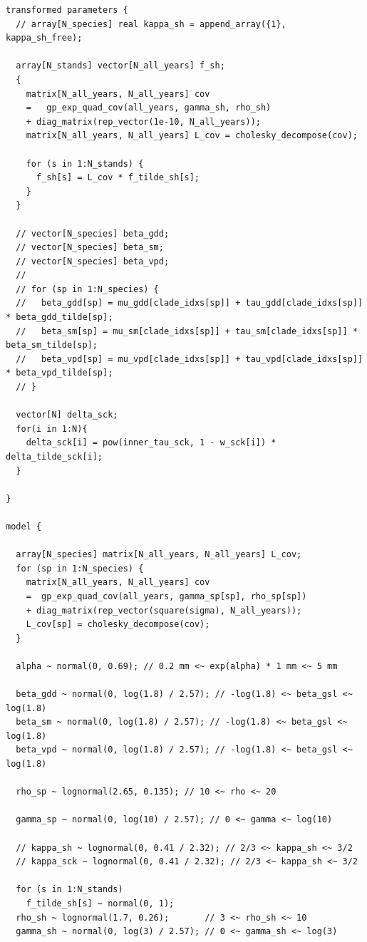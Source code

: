 \documentclass[
  letterpaper,
  DIV=11,
  numbers=noendperiod]{scrartcl}
\begin{document}
\begin{verbatim}
transformed parameters {
  // array[N_species] real kappa_sh = append_array({1}, kappa_sh_free);
  
  array[N_stands] vector[N_all_years] f_sh;
  {
    matrix[N_all_years, N_all_years] cov
    =   gp_exp_quad_cov(all_years, gamma_sh, rho_sh)
    + diag_matrix(rep_vector(1e-10, N_all_years));
    matrix[N_all_years, N_all_years] L_cov = cholesky_decompose(cov);
    
    for (s in 1:N_stands) {
      f_sh[s] = L_cov * f_tilde_sh[s];
    }
  }
  
  // vector[N_species] beta_gdd;
  // vector[N_species] beta_sm;
  // vector[N_species] beta_vpd;
  // 
  // for (sp in 1:N_species) {
  //   beta_gdd[sp] = mu_gdd[clade_idxs[sp]] + tau_gdd[clade_idxs[sp]] * beta_gdd_tilde[sp];
  //   beta_sm[sp] = mu_sm[clade_idxs[sp]] + tau_sm[clade_idxs[sp]] * beta_sm_tilde[sp];
  //   beta_vpd[sp] = mu_vpd[clade_idxs[sp]] + tau_vpd[clade_idxs[sp]] * beta_vpd_tilde[sp];
  // }

  vector[N] delta_sck;
  for(i in 1:N){
    delta_sck[i] = pow(inner_tau_sck, 1 - w_sck[i]) * delta_tilde_sck[i];
  }
  
}

model {
  
  array[N_species] matrix[N_all_years, N_all_years] L_cov;
  for (sp in 1:N_species) {
    matrix[N_all_years, N_all_years] cov
    =  gp_exp_quad_cov(all_years, gamma_sp[sp], rho_sp[sp])
    + diag_matrix(rep_vector(square(sigma), N_all_years));
    L_cov[sp] = cholesky_decompose(cov);
  }
  
  alpha ~ normal(0, 0.69); // 0.2 mm <~ exp(alpha) * 1 mm <~ 5 mm
  
  beta_gdd ~ normal(0, log(1.8) / 2.57); // -log(1.8) <~ beta_gsl <~ log(1.8)
  beta_sm ~ normal(0, log(1.8) / 2.57); // -log(1.8) <~ beta_gsl <~ log(1.8)
  beta_vpd ~ normal(0, log(1.8) / 2.57); // -log(1.8) <~ beta_gsl <~ log(1.8)
  
  rho_sp ~ lognormal(2.65, 0.135); // 10 <~ rho <~ 20
  
  gamma_sp ~ normal(0, log(10) / 2.57); // 0 <~ gamma <~ log(10)
  
  // kappa_sh ~ lognormal(0, 0.41 / 2.32); // 2/3 <~ kappa_sh <~ 3/2
  // kappa_sck ~ lognormal(0, 0.41 / 2.32); // 2/3 <~ kappa_sh <~ 3/2
  
  for (s in 1:N_stands)
    f_tilde_sh[s] ~ normal(0, 1);
  rho_sh ~ lognormal(1.7, 0.26);       // 3 <~ rho_sh <~ 10
  gamma_sh ~ normal(0, log(3) / 2.57); // 0 <~ gamma_sh <~ log(3)
  

\end{verbatim}
\end{document}
